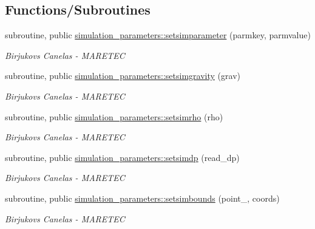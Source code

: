\subsection*{Functions/\+Subroutines}
\begin{DoxyCompactItemize}
\item 
subroutine, public \mbox{\hyperlink{namespacesimulation__parameters_af905a4701f68f0ad0a50606101fda7d6}{simulation\+\_\+parameters\+::setsimparameter}} (parmkey, parmvalue)
\begin{DoxyCompactList}\small\item\em Birjukovs Canelas -\/ M\+A\+R\+E\+T\+EC \end{DoxyCompactList}\item 
subroutine, public \mbox{\hyperlink{namespacesimulation__parameters_a21b04e29ccee801263abc6e27fba026f}{simulation\+\_\+parameters\+::setsimgravity}} (grav)
\begin{DoxyCompactList}\small\item\em Birjukovs Canelas -\/ M\+A\+R\+E\+T\+EC \end{DoxyCompactList}\item 
subroutine, public \mbox{\hyperlink{namespacesimulation__parameters_a4190b1bba60a505d50ba93973f158e5f}{simulation\+\_\+parameters\+::setsimrho}} (rho)
\begin{DoxyCompactList}\small\item\em Birjukovs Canelas -\/ M\+A\+R\+E\+T\+EC \end{DoxyCompactList}\item 
subroutine, public \mbox{\hyperlink{namespacesimulation__parameters_a757c1773e1c21deb9f3bfd2dc258bd1a}{simulation\+\_\+parameters\+::setsimdp}} (read\+\_\+dp)
\begin{DoxyCompactList}\small\item\em Birjukovs Canelas -\/ M\+A\+R\+E\+T\+EC \end{DoxyCompactList}\item 
subroutine, public \mbox{\hyperlink{namespacesimulation__parameters_a71f285f54b412efac79d40c9ecd58037}{simulation\+\_\+parameters\+::setsimbounds}} (point\+\_\+, coords)
\begin{DoxyCompactList}\small\item\em Birjukovs Canelas -\/ M\+A\+R\+E\+T\+EC \end{DoxyCompactList}\end{DoxyCompactItemize}
